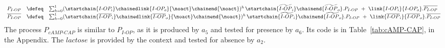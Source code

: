\[\begin{array}{lcl}
P_{I\textrm{-}OP}&\defeq & 
\sum_{h=0}^1 (\startchain{I\textrm{-}OP_i}\chainedlink{I\textrm{-}OP_o}{\noact}\chainend{\noact})^h  \, \startchain{\widetilde{I\textrm{-}OP}_i}\chainend{\widetilde{I\textrm{-}OP}_o}.P_{I\textrm{-}OP}
\  +\ %
\link{I\textrm{-}OP_i}{I\textrm{-}OP_o}.\overline{P_{I\textrm{-}OP}}\\
\overline{P_{I\textrm{-}OP}} & \defeq & 
\sum_{h=0}^1  (\startchain{\overline{I\textrm{-}OP}_i}\chainedlink{\overline{I\textrm{-}OP}_o}{\noact}\chainend{\noact})^h \,
\startchain{\widetilde{I\textrm{-}OP}_i}\chainend{\widetilde{I\textrm{-}OP}_o}.P_{I\textrm{-}OP}%
\ +\ %
\link{\overline{I\textrm{-}OP}_i}{\overline{I\textrm{-}OP}_o}.\overline{P_{I\textrm{-}OP}}\\

\end{array}
\]
\noindent
The  process $P_{cAMP\textrm{-}CAP}$ is similar to $P_{I\textrm{-}OP}$, as it is produced by $a_5$ and tested for presence by $a_6$. Its code is  in Table~\ref{tab:cAMP-CAP}, in the Appendix.
The $lactose$ is provided by the context and tested for absence by $a_2$.

